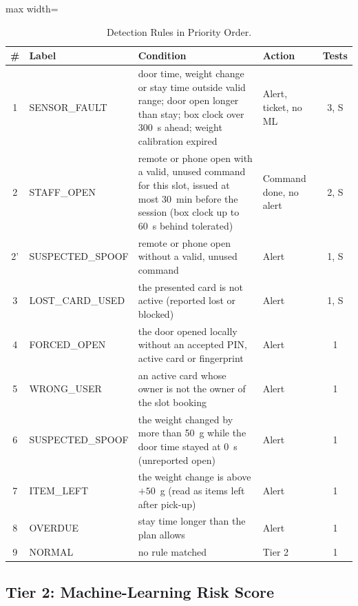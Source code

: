 \documentclass[manuscript,screen]{acmart}
\begin{document}
\begin{table}[htbp]
\centering
\footnotesize
\caption{Detection Rules in Priority Order.}
\label{tab:rules}
\begin{adjustbox}{max width=\textwidth}
\begin{tabular}{c l p{8.1cm} l c}
\toprule
\# & Label & Condition & Action & Tests \\
\midrule
1 & SENSOR\_FAULT & door time, weight change or stay time outside valid range; door open longer than stay; box clock over 300~s ahead; weight calibration expired & Alert, ticket, no ML & 3, S \\[2pt]
2 & STAFF\_OPEN & remote or phone open with a valid, unused command for this slot, issued at most 30~min before the session (box clock up to 60~s behind tolerated) & Command done, no alert & 2, S \\[2pt]
2' & SUSPECTED\_SPOOF & remote or phone open without a valid, unused command & Alert & 1, S \\[2pt]
3 & LOST\_CARD\_USED & the presented card is not active (reported lost or blocked) & Alert & 1, S \\[2pt]
4 & FORCED\_OPEN & the door opened locally without an accepted PIN, active card or fingerprint & Alert & 1 \\[2pt]
5 & WRONG\_USER & an active card whose owner is not the owner of the slot booking & Alert & 1 \\[2pt]
6 & SUSPECTED\_SPOOF & the weight changed by more than 50~g while the door time stayed at 0~s (unreported open) & Alert & 1 \\[2pt]
7 & ITEM\_LEFT & the weight change is above $+50$~g (read as items left after pick-up) & Alert & 1 \\[2pt]
8 & OVERDUE & stay time longer than the plan allows & Alert & 1 \\[2pt]
9 & NORMAL & no rule matched & Tier 2 & 1 \\
\bottomrule
\end{tabular}
\end{adjustbox}
\end{table}

\subsection{Tier 2: Machine-Learning Risk Score}
\end{document}
